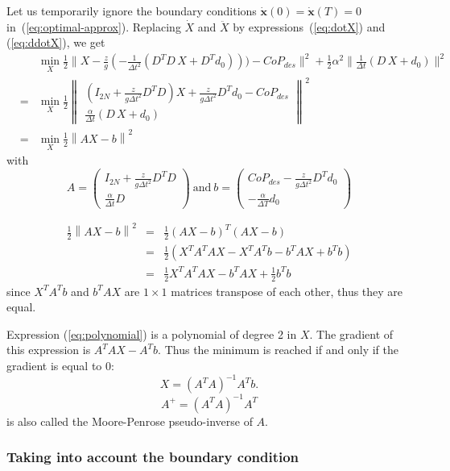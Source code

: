 \documentclass{article}
\newcommand\vect[1]{\mathbf{#1}}
\newcommand\dx{\vect{\dot{x}}}
\begin{document}
Let us temporarily ignore the boundary conditions $\dx(0)=\dx(T)=0$ in~(\ref{eq:optimal-approx}).
Replacing $\dot{X}$ and $\ddot{X}$ by expressions~(\ref{eq:dotX}) and (\ref{eq:ddotX}), we get
\begin{eqnarray*}
&&  \min_{X}\frac{1}{2}\|X - \frac{z}{g}(-\frac{1}{\Delta t^2} (D^TD\,X + D^Td_0))) - CoP_{des}\|^2 + \frac{1}{2}\alpha^2\|\frac{1}{\Delta t}(D\,X + d_0)\|^2\\
  &=&  \min_{X}\frac{1}{2}\left\|\begin{array}{c}(I_{2N} + \frac{z}{g\Delta t^2}D^TD) X + \frac{z}{g\Delta t^2}D^Td_0 - CoP_{des}\\ \frac{\alpha}{\Delta t}(D\,X + d_0)\end{array}\right\|^2\\
  &=& \min_{X}\frac{1}{2}\left\| AX - b \right\|^2
\end{eqnarray*}
with
$$
A = \left(\begin{array}{c}I_{2N} + \frac{z}{g\Delta t^2}D^TD\\
  \frac{\alpha}{\Delta t}D\end{array}\right)\ \mbox{and}\
  b = \left(\begin{array}{c}CoP_{des} - \frac{z}{g\Delta t^2}D^Td_0\\
    -\frac{\alpha}{\Delta T}d_0\end{array}\right)
$$

\begin{eqnarray}
  \frac{1}{2}\left\| AX - b \right\|^2 &=& \frac{1}{2}(AX - b)^T(AX - b)\\
  &=& \frac{1}{2}(X^T A^TAX - X^TA^T b - b^TAX + b^Tb)\\
  \label{eq:polynomial}
  &=& \frac{1}{2} X^T A^TAX -b^TAX + \frac{1}{2}b^Tb
\end{eqnarray}
since $X^TA^T b$ and $b^TAX$ are  $1\times 1$ matrices transpose of each other, thus they are equal.

Expression (\ref{eq:polynomial}) is a polynomial of degree 2 in $X$. The gradient of this
expression is $A^TAX -A^Tb$. Thus the minimum is reached if and only if the gradient is equal to 0:
$$
X = (A^TA)^{-1}A^Tb.
$$
$$
A^{+} = (A^TA)^{-1}A^T
$$
is also called the Moore-Penrose pseudo-inverse of $A$.

\subsubsection{Taking into account the boundary condition}
\end{document}
